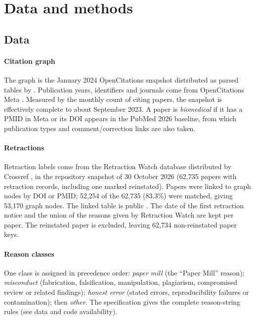 \section{Data and methods}\label{sec:methods}

\subsection{Data}
\paragraph{Citation graph} The graph is the January 2024 OpenCitations snapshot distributed as parsed tables by
\citet{arjomandi2024dataset} \citep[see also][]{peroni2020opencitations}. Publication years, identifiers and journals
come from OpenCitations Meta \citep{massari2024meta,ocmeta2024dump}. Measured by the monthly count of citing papers,
the snapshot is effectively complete to about September 2023. A paper is \emph{biomedical} if it has a PMID in Meta or
its DOI appears in the PubMed 2026 baseline, from which publication types and comment/correction links are also taken.

\paragraph{Retractions} Retraction labels come from the Retraction Watch database distributed by Crossref
\citep{rittman2025rw}, in the repository snapshot of 30 October 2026 (62,735 papers with retraction records,
including one marked reinstated). Papers were linked to graph
nodes by DOI or PMID; 52,254 of the 62,735 (83.3\%) were matched, giving 53,170 graph nodes. The linked table is
public \citep{arjomandi2026retracteddata}. The date of the first retraction notice and the union of the reasons given
by Retraction Watch are kept per paper. The reinstated paper is excluded, leaving 62,734 non-reinstated paper keys.

\paragraph{Reason classes} One class is assigned in precedence order: \emph{paper mill} (the ``Paper Mill'' reason);
\emph{misconduct} (fabrication, falsification, manipulation, plagiarism, compromised review or related findings);
\emph{honest error} (stated errors, reproducibility failures or contamination); then \emph{other}.
The specification gives the complete reason-string rules (see data and code availability).

